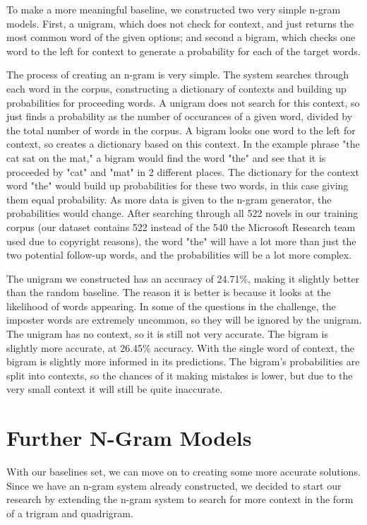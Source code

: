 \documentclass{article}
\begin{document}
To make a more meaningful baseline, we constructed two very simple n-gram models. First, a unigram, which does not check for context, and just returns the most common word of the given options; and second a bigram, which checks one word to the left for context to generate a probability for each of the target words.

The process of creating an n-gram is very simple. The system searches through each word in the corpus, constructing a dictionary of contexts and building up probabilities for proceeding words. A unigram does not search for this context, so just finds a probability as the number of occurances of a given word, divided by the total number of words in the corpus. A bigram looks one word to the left for context, so creates a dictionary based on this context. In the example phrase "the cat sat on the mat," a bigram would find the word "the" and see that it is proceeded by "cat" and "mat" in 2 different places. The dictionary for the context word "the" would build up probabilities for these two words, in this case giving them equal probability. As more data is given to the n-gram generator, the probabilities would change. After searching through all 522 novels in our training corpus (our dataset contains 522 instead of the 540 the Microsoft Research team used due to copyright reasons), the word "the" will have a lot more than just the two potential follow-up words, and the probabilities will be a lot more complex.

The unigram we constructed has an accuracy of 24.71\%, making it slightly better than the random baseline. The reason it is better is because it looks at the likelihood of words appearing. In some of the questions in the challenge, the imposter words are extremely uncommon, so they will be ignored by the unigram. The unigram has no context, so it is still not very accurate. The bigram is slightly more accurate, at 26.45\% accuracy. With the single word of context, the bigram is slightly more informed in its predictions. The bigram's probabilities are split into contexts, so the chances of it making mistakes is lower, but due to the very small context it will still be quite inaccurate.

\section{Further N-Gram Models}
With our baselines set, we can move on to creating some more accurate solutions. Since we have an n-gram system already constructed, we decided to start our research by extending the n-gram system to search for more context in the form of a trigram and quadrigram.
\end{document}
